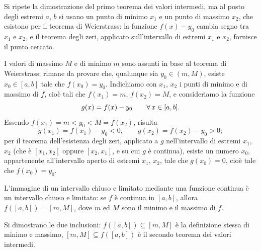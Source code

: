 \begin{strategia}
Si ripete la dimostrazione del primo teorema dei valori intermedi, ma al posto degli
estremi $a$, $b$ si usano un punto di minimo $x_{1}$ e un punto di massimo $x_{2}$, che
esistono per il teorema di Weierstrass: la funzione $f(x)-y_{0}$ cambia segno tra
$x_{1}$ e $x_{2}$, e il teorema degli zeri, applicato sull'intervallo di estremi $x_{1}$
e $x_{2}$, fornisce il punto cercato.
\end{strategia}

\begin{dimostrazione}
I valori di massimo $M$ e di minimo $m$ sono assunti in base al teorema di Weierstrass;
rimane da provare che, qualunque sia $y_{0}\in(m,M)$, esiste $x_{0}\in[a,b]$ tale che
$f(x_{0})=y_{0}$. Indichiamo con $x_{1}$, $x_{2}$ i punti di minimo e di massimo di $f$,
cioè tali che $f(x_{1})=m$, $f(x_{2})=M$, e consideriamo la funzione
\begin{equation}\label{eq:vi2-g}
  g(x)=f(x)-y_{0} \qquad\forall\, x\in[a,b].
\end{equation}
Essendo $f(x_{1})=m<y_{0}<M=f(x_{2})$, risulta
\begin{equation}\label{eq:vi2-segni}
  g(x_{1})=f(x_{1})-y_{0}<0, \qquad g(x_{2})=f(x_{2})-y_{0}>0;
\end{equation}
per il teorema dell'esistenza degli zeri, applicato a $g$ nell'intervallo di estremi
$x_{1}$, $x_{2}$ (che è $[x_{1},x_{2}]$ oppure $[x_{2},x_{1}]$, e su cui $g$ è continua),
esiste un numero $x_{0}$, appartenente all'intervallo aperto di estremi $x_{1}$, $x_{2}$,
tale che $g(x_{0})=0$, cioè tale che $f(x_{0})=y_{0}$.
\end{dimostrazione}

\begin{corollario}\label{cor:immagine-intervallo}
L'immagine di un intervallo chiuso e limitato mediante una funzione continua è un
intervallo chiuso e limitato: se $f$ è continua in $[a,b]$, allora
$f([a,b])=[m,M]$, dove $m$ ed $M$ sono il minimo e il massimo di $f$.
\end{corollario}

\begin{schema}
\end{schema}

\begin{strategia}
Si dimostrano le due inclusioni: $f([a,b])\subseteq[m,M]$ è la definizione stessa di
minimo e massimo, $[m,M]\subseteq f([a,b])$ è il secondo teorema dei valori intermedi.
\end{strategia}

